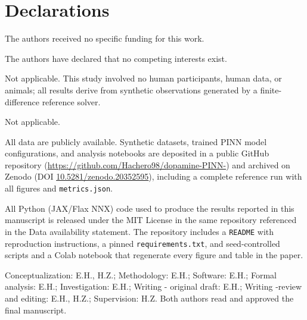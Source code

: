 \documentclass[pdflatex,sn-basic,Numbered]{sn-jnl}
\theoremstyle{thmstyleone}
\theoremstyle{thmstyletwo}
\begin{document}
\section*{Declarations}

The authors received no specific funding for this work.

The authors have declared that no competing interests exist.

Not applicable. This study involved no human participants,
human data, or animals; all results derive from synthetic
observations generated by a finite-difference reference solver.

Not applicable.

All data are publicly available. Synthetic datasets, trained
PINN model configurations, and analysis notebooks are deposited
in a public GitHub repository
(\url{https://github.com/Hachero98/dopamine-PINN-}) and archived
on Zenodo (DOI
\href{https://doi.org/10.5281/zenodo.20352595}{10.5281/zenodo.20352595}),
including a complete reference run with all figures and
\texttt{metrics.json}.

All Python (JAX/Flax NNX) code used to produce the results
reported in this manuscript is released under the MIT License
in the same repository referenced in the Data availability
statement. The repository includes a \texttt{README} with
reproduction instructions, a pinned \texttt{requirements.txt},
and seed-controlled scripts and a Colab notebook that
regenerate every figure and table in the paper.

Conceptualization: E.H., H.Z.; Methodology: E.H.; Software: E.H.;
Formal analysis: E.H.; Investigation: E.H.; Writing - original
draft: E.H.; Writing -review and editing: E.H., H.Z.;
Supervision: H.Z. Both authors read and approved the final
manuscript.


\setlength{\bibsep}{0pt plus 0.3ex}


\end{document}
